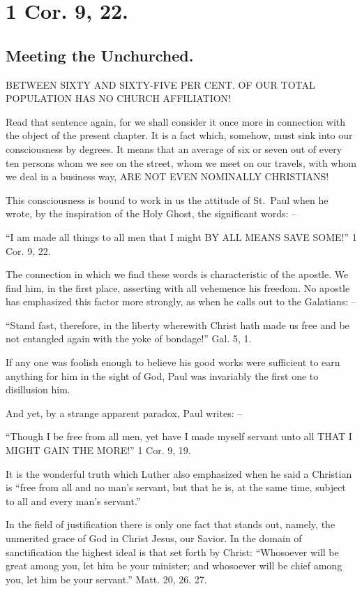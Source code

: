 \documentclass[
]{book}
\begin{document}
\section*{1 Cor. 9, 22.}\label{cor.-9-22.}

\subsection*{Meeting the Unchurched.}\label{meeting-the-unchurched.}

BETWEEN SIXTY AND SIXTY-FIVE PER CENT. OF OUR TOTAL POPULATION HAS NO CHURCH AFFILIATION!

Read that sentence again, for we shall consider it once more in connection with the object of the present chapter. It is a fact which, somehow, must sink into our consciousness by degrees. It means that an average of six or seven out of every ten persons whom we see on the street, whom we meet on our travels, with whom we deal in a business way, ARE NOT EVEN NOMINALLY CHRISTIANS!

This consciousness is bound to work in us the attitude of St.~Paul when he wrote, by the inspiration of the Holy Ghost, the significant words: --

``I am made all things to all men that I might BY ALL MEANS SAVE SOME!'' 1 Cor. 9, 22.

The connection in which we find these words is characteristic of the apostle. We find him, in the first place, asserting with all vehemence his freedom. No apostle has emphasized this factor more strongly, as when he calls out to the Galatians: --

``Stand fast, therefore, in the liberty wherewith Christ hath made us free and be not entangled again with the yoke of bondage!'' Gal. 5, 1.

If any one was foolish enough to believe his good works were sufficient to earn anything for him in the sight of God, Paul was invariably the first one to disillusion him.

And yet, by a strange apparent paradox, Paul writes: --

``Though I be free from all men, yet have I made myself servant unto all THAT I MIGHT GAIN THE MORE!'' 1 Cor. 9, 19.

It is the wonderful truth which Luther also emphasized when he said a Christian is ``free from all and no man's servant, but that he is, at the same time, subject to all and every man's servant.''

In the field of justification there is only one fact that stands out, namely, the unmerited grace of God in Christ Jesus, our Savior. In the domain of sanctification the highest ideal is that set forth by Christ: ``Whosoever will be great among you, let him be your minister; and whosoever will be chief among you, let him be your servant.'' Matt. 20, 26. 27.
\end{document}
